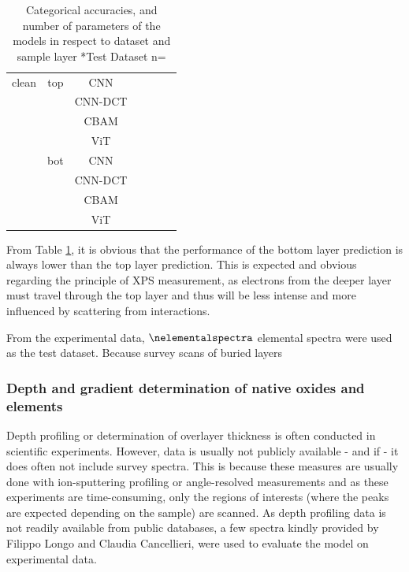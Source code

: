 \begin{table}[H]
{\begin{tabular}{c|c|c|c|c|c|c}
        \hline                                   
        clean   & top   & CNN     &                &               &                &            \\
                &       & CNN-DCT &                &               &                &            \\
                &       & CBAM    &                &               &                &            \\
                &       & ViT     &                &               &                &            \\
        \hdashline
                & bot   & CNN     &                &               &                &             \\
                &       & CNN-DCT &                &               &                &             \\
                &       & CBAM    &                &               &                &            \\
                &       & ViT     &                &               &                &            \\
    \end{tabular}}
    \caption{Categorical accuracies, and number of parameters of the models in respect to dataset and sample layer
    *Test Dataset n=\nelementalspectra}
    \label{tab:acc_qual}
\end{table}

From Table \ref{tab:acc_qual}, it is obvious that the performance of the bottom layer prediction is always lower than the top layer prediction. This is expected and obvious regarding the principle of XPS measurement, as electrons from the deeper layer must travel through the top layer and thus will be less intense and more influenced by scattering from interactions.

From the experimental data, $\nelementalspectra$ elemental spectra were used as the test dataset. Because survey scans of buried layers

\subsubsection{Depth and gradient determination of native oxides and elements}
Depth profiling or determination of overlayer thickness is often conducted in scientific experiments. However, data is usually not publicly available - and if - it does often not include survey spectra. This is because these measures are usually done with ion-sputtering profiling or angle-resolved measurements and as these experiments are time-consuming, only the regions of interests (where the peaks are expected depending on the sample) are scanned.
As depth profiling data is not readily available from public databases, a few spectra kindly provided by Filippo Longo and Claudia Cancellieri, were used to evaluate the model on experimental data.


